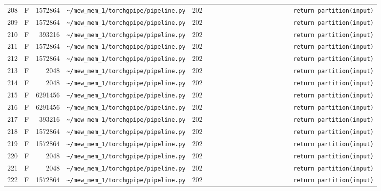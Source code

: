 \documentclass{article}
\begin{document}
\begin{longtable}{r l r p{6.5cm} r p{7.0cm}}
208 & F & 1572864 & \lstinline|~/mew_mem_1/torchgpipe/pipeline.py| & 202 & \lstinline|                        return partition(input)| \\
209 & F & 1572864 & \lstinline|~/mew_mem_1/torchgpipe/pipeline.py| & 202 & \lstinline|                        return partition(input)| \\
210 & F & 393216 & \lstinline|~/mew_mem_1/torchgpipe/pipeline.py| & 202 & \lstinline|                        return partition(input)| \\
211 & F & 1572864 & \lstinline|~/mew_mem_1/torchgpipe/pipeline.py| & 202 & \lstinline|                        return partition(input)| \\
212 & F & 1572864 & \lstinline|~/mew_mem_1/torchgpipe/pipeline.py| & 202 & \lstinline|                        return partition(input)| \\
213 & F & 2048 & \lstinline|~/mew_mem_1/torchgpipe/pipeline.py| & 202 & \lstinline|                        return partition(input)| \\
214 & F & 2048 & \lstinline|~/mew_mem_1/torchgpipe/pipeline.py| & 202 & \lstinline|                        return partition(input)| \\
215 & F & 6291456 & \lstinline|~/mew_mem_1/torchgpipe/pipeline.py| & 202 & \lstinline|                        return partition(input)| \\
216 & F & 6291456 & \lstinline|~/mew_mem_1/torchgpipe/pipeline.py| & 202 & \lstinline|                        return partition(input)| \\
217 & F & 393216 & \lstinline|~/mew_mem_1/torchgpipe/pipeline.py| & 202 & \lstinline|                        return partition(input)| \\
218 & F & 1572864 & \lstinline|~/mew_mem_1/torchgpipe/pipeline.py| & 202 & \lstinline|                        return partition(input)| \\
219 & F & 1572864 & \lstinline|~/mew_mem_1/torchgpipe/pipeline.py| & 202 & \lstinline|                        return partition(input)| \\
220 & F & 2048 & \lstinline|~/mew_mem_1/torchgpipe/pipeline.py| & 202 & \lstinline|                        return partition(input)| \\
221 & F & 2048 & \lstinline|~/mew_mem_1/torchgpipe/pipeline.py| & 202 & \lstinline|                        return partition(input)| \\
222 & F & 1572864 & \lstinline|~/mew_mem_1/torchgpipe/pipeline.py| & 202 & \lstinline|                        return partition(input)| \\

\end{longtable}
\end{document}
